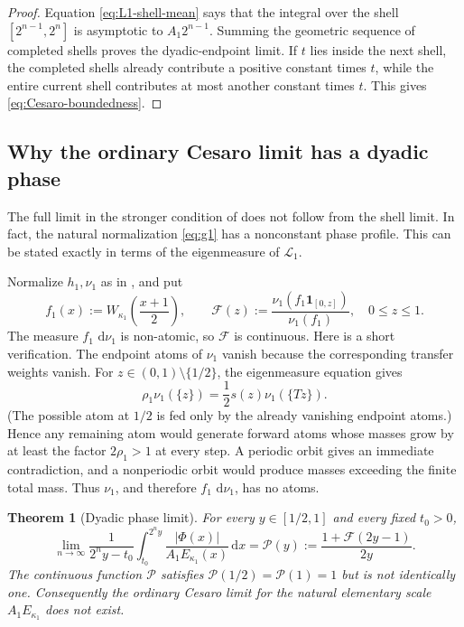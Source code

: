 \documentclass[11pt,oneside]{article}
\newtheorem{theorem}{Theorem}[section]
\theoremstyle{definition}
\theoremstyle{remark}
\newcommand{\dd}{\,\mathrm d}
\newcommand{\Phiup}{\Phi}
\newcommand{\abs}[1]{\left|#1\right|}
\begin{document}
\begin{proof}
Equation \eqref{eq:L1-shell-mean} says that the integral over the shell
$[2^{n-1},2^n]$ is asymptotic to $A_1 2^{n-1}$.  Summing the geometric sequence of completed
shells proves the dyadic-endpoint limit.  If $t$ lies inside the next shell, the completed
shells already contribute a positive constant times $t$, while the entire current shell
contributes at most another constant times $t$.  This gives \eqref{eq:Cesaro-boundedness}.
\end{proof}

\subsection{Why the ordinary Cesaro limit has a dyadic phase}
\label{subsec:phase-profile}

The full limit in the stronger condition of \cite{mse-decay} does not follow from the shell
limit.  In fact, the natural normalization \eqref{eq:g1} has a nonconstant phase profile.
This can be stated exactly in terms of the eigenmeasure of $\mathcal L_1$.

Normalize $h_1,\nu_1$ as in , and put
\[
 f_1(x):=W_{\kappa_1}\!\left(\frac{x+1}{2}\right),
 \qquad
 \mathscr F(z):=
 \frac{\nu_1(f_1\mathbf1_{[0,z]})}{\nu_1(f_1)},
 \quad 0\le z\le1.
 \label{eq:phase-distribution}
\]
The measure $f_1\,\dd\nu_1$ is non-atomic, so $\mathscr F$ is continuous.  Here is a
short verification.  The endpoint atoms of $\nu_1$ vanish because the corresponding
transfer weights vanish.  For $z\in(0,1)\setminus\{1/2\}$, the eigenmeasure equation gives
\[
 \rho_1\nu_1(\{z\})=\frac12s(z)\nu_1(\{Tz\}).
\]
(The possible atom at $1/2$ is fed only by the already vanishing endpoint atoms.)  Hence any
remaining atom would generate forward atoms whose masses grow by at least the factor
$2\rho_1>1$ at every step.  A periodic orbit gives an immediate contradiction, and a
nonperiodic orbit would produce masses exceeding the finite total mass.  Thus $\nu_1$, and
therefore $f_1\,\dd\nu_1$, has no atoms.

\begin{theorem}[Dyadic phase limit]
\label{thm:phase-limit}
For every $y\in[1/2,1]$ and every fixed $t_0>0$,
\begin{equation}
 \lim_{n\to\infty}
 \frac1{2^ny-t_0}\int_{t_0}^{2^ny}
 \frac{\abs{\Phiup(x)}}{A_1E_{\kappa_1}(x)}\dd x
 =\mathscr P(y):=\frac{1+\mathscr F(2y-1)}{2y}.
 \label{eq:phase-limit}
\end{equation}
The continuous function $\mathscr P$ satisfies
$\mathscr P(1/2)=\mathscr P(1)=1$ but is not identically one.  Consequently the ordinary
Cesaro limit for the natural elementary scale $A_1E_{\kappa_1}$ does not exist.
\end{theorem}
\end{document}
